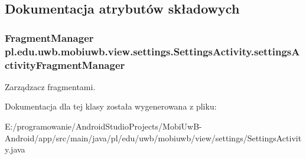\subsection{Dokumentacja atrybutów składowych}
\hypertarget{classpl_1_1edu_1_1uwb_1_1mobiuwb_1_1view_1_1settings_1_1_settings_activity_a09a9e46831f553a89ca549e04770794c}{}
\subsubsection[{settings\+Activity\+Fragment\+Manager}]{\setlength{\rightskip}{0pt plus 5cm}Fragment\+Manager pl.\+edu.\+uwb.\+mobiuwb.\+view.\+settings.\+Settings\+Activity.\+settings\+Activity\+Fragment\+Manager\hspace{0.3cm}{\ttfamily [static]}}\label{classpl_1_1edu_1_1uwb_1_1mobiuwb_1_1view_1_1settings_1_1_settings_activity_a09a9e46831f553a89ca549e04770794c}
Zarządzacz fragmentami. 

Dokumentacja dla tej klasy została wygenerowana z pliku\+:\begin{DoxyCompactItemize}
\item 
E\+:/programowanie/\+Android\+Studio\+Projects/\+Mobi\+Uw\+B-\/\+Android/app/src/main/java/pl/edu/uwb/mobiuwb/view/settings/Settings\+Activity.\+java\end{DoxyCompactItemize}
